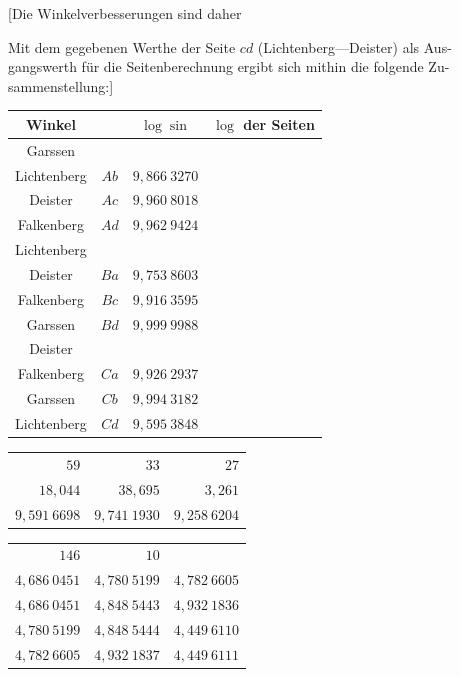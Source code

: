 \documentclass[12pt,a4paper]{article}
\theoremstyle{plain}
\theoremstyle{definition}
\theoremstyle{remark}
\begin{document}
[Die Winkelverbesserungen sind daher

Mit dem gegebenen Werthe der Seite $cd$ (Lichtenberg---Deister) als Aus-
gangswerth f\"ur die Seitenberechnung ergibt sich mithin die folgende Zu-
sammenstellung:]

\begin{center}
\begin{tabular}{|c|c|c|c|}
\hline
Winkel & & $\log \sin$ & $\log$ der Seiten \\
\hline
Garssen & & & \\
\quad Lichtenberg & $Ab$ & $9{,}866\ 3270$ & \\
\quad Deister & $Ac$ & $9{,}960\ 8018$ & \\
\quad Falkenberg & $Ad$ & $9{,}962\ 9424$ & \\
\hline
Lichtenberg & & & \\
\quad Deister & $Ba$ & $9{,}753\ 8603$ & \\
\quad Falkenberg & $Bc$ & $9{,}916\ 3595$ & \\
\quad Garssen & $Bd$ & $9{,}999\ 9988$ & \\
\hline
Deister & & & \\
\quad Falkenberg & $Ca$ & $9{,}926\ 2937$ & \\
\quad Garssen & $Cb$ & $9{,}994\ 3182$ & \\
\quad Lichtenberg & $Cd$ & $9{,}595\ 3848$ & \\
\hline
\end{tabular}
\end{center}

\begin{center}
\begin{tabular}{r@{\qquad}r@{\qquad}r}
$59$ & $33$ & $27$ \\
$18{,}044$ & $38{,}695$ & $3{,}261$ \\
$9{,}591\ 6698$ & $9{,}741\ 1930$ & $9{,}258\ 6204$ \\
\end{tabular}
\end{center}

\begin{center}
\begin{tabular}{r@{\qquad}r@{\qquad}r}
$146$ & $10$ & \\
$4{,}686\ 0451$ & $4{,}780\ 5199$ & $4{,}782\ 6605$ \\
$4{,}686\ 0451$ & $4{,}848\ 5443$ & $4{,}932\ 1836$ \\
$4{,}780\ 5199$ & $4{,}848\ 5444$ & $4{,}449\ 6110$ \\
$4{,}782\ 6605$ & $4{,}932\ 1837$ & $4{,}449\ 6111$ \\
\end{tabular}
\end{center}
\end{document}
